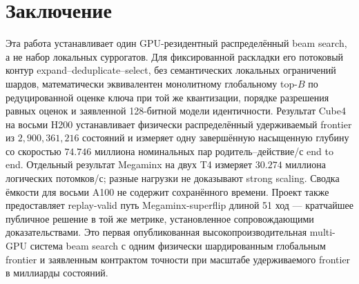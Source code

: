 \documentclass[10pt,twocolumn]{article}
\begin{document}
\section{Заключение}
Эта работа устанавливает один GPU-резидентный распределённый beam search, а не
набор локальных суррогатов. Для фиксированной раскладки его потоковый контур
expand--deduplicate--select, без семантических локальных ограничений шардов,
математически эквивалентен монолитному глобальному top-$B$ по редуцированной
оценке ключа при той же квантизации, порядке разрешения равных оценок и
заявленной 128-битной модели идентичности. Результат Cube4 на восьми H200
устанавливает физически распределённый удерживаемый frontier из
$2{,}900{,}361{,}216$ состояний и измеряет одну завершённую насыщенную глубину
со скоростью $74.746$ миллиона номинальных пар родитель--действие/с end to end.
Отдельный результат Megaminx на двух T4 измеряет $30.274$ миллиона логических
потомков/с; разные нагрузки не доказывают strong scaling. Сводка ёмкости для
восьми A100 не содержит сохранённого времени. Проект также
предоставляет replay-valid путь Megaminx-superflip длиной 51 ход --- кратчайшее
публичное решение в той же метрике, установленное сопровождающими
доказательствами. Это первая опубликованная высокопроизводительная multi-GPU
система beam search с одним физически шардированным глобальным frontier и
заявленным контрактом точности при масштабе удерживаемого frontier в миллиарды
состояний.

\clearpage
\begingroup
\small


\endgroup
\end{document}
